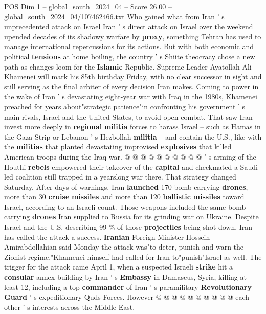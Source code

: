 \begin{textsample}{POS Dim 1 – global\_south\_2024\_04 – Score 26.00 – global\_south\_2024\_04/107462466.txt}  \label{ex:f1_pos_048}
Who gained what from Iran ' s unprecedented attack on Israel Iran ' s direct attack on Israel over the weekend upended decades of its shadowy warfare by \textbf{proxy}, something Tehran has used to manage international repercussions for its actions.
But with both economic and political \textbf{tensions} at home boiling, the country ' s Shiite theocracy chose a new path as changes loom for the \textbf{Islamic} Republic.
Supreme Leader Ayatollah Ali Khamenei will mark his 85th birthday Friday, with no clear successor in sight and still serving as the final arbiter of every decision Iran makes.
Coming to power in the wake of Iran ' s devastating eight-year war with Iraq in the 1980s, Khamenei preached for years about"strategic patience"in confronting his government ' s main rivals, Israel and the United States, to avoid open combat.
That saw Iran invest more deeply in \textbf{regional} \textbf{militia} forces to harass Israel -- such as Hamas in the Gaza Strip or Lebanon ' s Hezbollah \textbf{militia} -- and contain the U.S., like with the \textbf{militias} that planted devastating improvised \textbf{explosives} that killed American troops during the Iraq war. @ @ @ @ @ @ @ @ @ @ ' s arming of the Houthi \textbf{rebels} empowered their takeover of the \textbf{capital} and checkmated a Saudi-led coalition still trapped in a yearslong war there.
That strategy changed Saturday.
After days of warnings, Iran \textbf{launched} 170 bomb-carrying \textbf{drones}, more than 30 \textbf{cruise} \textbf{missiles} and more than 120 \textbf{ballistic} \textbf{missiles} toward Israel, according to an Israeli count.
Those weapons included the same bomb-carrying \textbf{drones} Iran supplied to Russia for its grinding war on Ukraine.
Despite Israel and the U.S. describing 99 \% of those \textbf{projectiles} being shot down, Iran has called the attack a success. \textbf{Iranian} Foreign Minister Hossein Amirabdollahian said Monday the attack was"to deter, punish and warn the Zionist regime."Khamenei himself had called for Iran to"punish"Israel as well.
The trigger for the attack came April 1, when a suspected Israeli \textbf{strike} hit a \textbf{consular} annex building by Iran ' s \textbf{Embassy} in Damascus, Syria, killing at least 12, including a top \textbf{commander} of Iran ' s paramilitary \textbf{Revolutionary} \textbf{Guard} ' s expeditionary Quds Forces.
However @ @ @ @ @ @ @ @ @ @ each other ' s interests across the Middle East.

\end{textsample}
